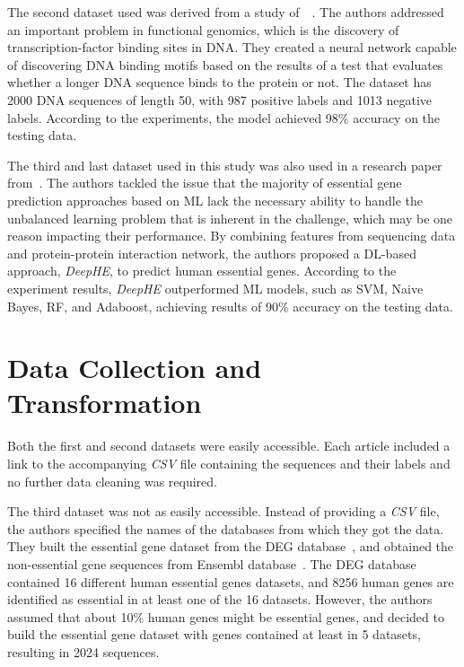 The second dataset used was derived from a study of~\citeauthor{Zou2018AGenomics}~\cite{Zou2018AGenomics}. The authors addressed an important problem in functional genomics, which is the discovery of transcription-factor binding sites in \gls{DNA}. They created a neural network capable of discovering \gls{DNA} binding motifs based on the results of a test that evaluates whether a longer \gls{DNA} sequence binds to the protein or not. The dataset has 2000 \gls{DNA} sequences of length 50, with 987 positive labels and 1013 negative labels. According to the experiments, the model achieved 98\% accuracy on the testing data.

The third and last dataset used in this study was also used in a research paper from~\citeauthor{Zhang2020DeepHE:Learning}. The authors tackled the issue that the majority of essential gene prediction approaches based on \gls{ML} lack the necessary ability to handle the unbalanced learning problem that is inherent in the challenge, which may be one reason impacting their performance. By combining features from sequencing data and protein-protein interaction network, the authors proposed a \gls{DL}-based approach, \textit{DeepHE}, to predict human essential genes. According to the experiment results, \textit{DeepHE} outperformed \gls{ML} models, such as \gls{SVM}, Naive Bayes, \gls{RF}, and Adaboost, achieving results of 90\% accuracy on the testing data. 

\section{Data Collection and Transformation}

Both the first and second datasets were easily accessible. Each article included a link to the accompanying \textit{CSV} file containing the sequences and their labels and no further data cleaning was required. 

The third dataset was not as easily accessible. Instead of providing a \textit{CSV} file, the authors specified the names of the databases from which they got the data. They built the essential gene dataset from the DEG database~\cite{Luo2014DEGElements}, and obtained the non-essential gene sequences from Ensembl database~\cite{Ruffier2017EnsemblAnnotation}. The DEG database contained 16 different human essential genes datasets, and 8256 human genes are identified as essential in at least one of the 16 datasets. However, the authors assumed that about 10\% human genes might be essential genes, and decided to build the essential gene dataset with genes contained at least in 5 datasets, resulting in 2024 sequences.

